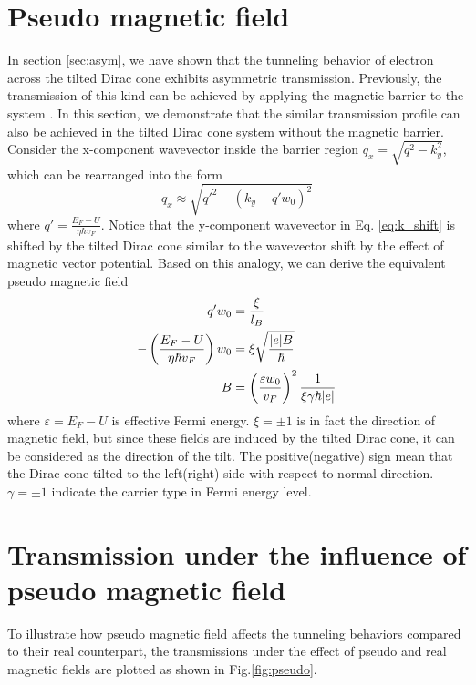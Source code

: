 \section{Pseudo magnetic field} \label{sec:pseudo b}
    In section \ref{sec:asym}, we have shown that the tunneling behavior of electron across the tilted Dirac cone exhibits asymmetric transmission. 
    Previously, the transmission of this kind can be achieved by applying the magnetic barrier to the system \cite{RamezaniMasir2008,RamezaniMasir2010}.
    In this section, we demonstrate that the similar transmission profile can also be achieved in the tilted Dirac cone system without the magnetic barrier.
    Consider the x-component wavevector inside the barrier region $q_x = \sqrt{q^2-k_y^2}$, which can be rearranged into the form
    \begin{equation} \label{eq:k_shift}
        q_x \approx \sqrt{q'^2 -(k_y-q'w_0)^2}
    \end{equation} 
    where $q' = \frac{E_F-U}{\eta \hbar v_F}$. 
    Notice that the y-component wavevector in Eq. \ref{eq:k_shift} is shifted by the tilted Dirac cone similar to the wavevector shift by the effect of magnetic vector potential.
    Based on this analogy, we can derive the equivalent pseudo magnetic field
    \begin{align}
        -q' w_0 &= \frac{\xi}{l_B} \notag \\
        -\left(\frac{E_F-U}{\eta \hbar v_F}\right) w_0 &= \xi\sqrt{\frac{|e| B}{\hbar}} \notag \\
        B &= \left(\frac{\varepsilon w_0}{v_F}\right)^2 \frac{1}{\xi \gamma \hbar |e|}
    \end{align}
    where $\varepsilon = E_F-U$ is effective Fermi energy. 
    $\xi = \pm 1$ is in fact the direction of magnetic field, but since these fields are induced by the tilted Dirac cone, it can be considered as the direction of the tilt.
    The positive(negative) sign mean that the Dirac cone tilted to the left(right) side with respect to normal direction. 
    $\gamma = \pm 1$ indicate the carrier type in Fermi energy level.


   
\section{Transmission under the influence of pseudo magnetic field}
    To illustrate how pseudo magnetic field affects the tunneling behaviors compared to their real counterpart,
    the transmissions under the effect of pseudo and real magnetic fields are plotted as shown in Fig.\ref{fig:pseudo}.

